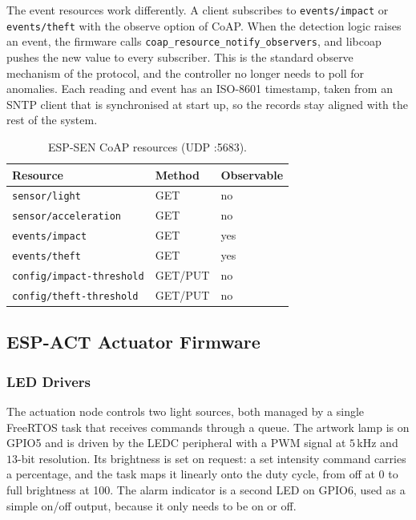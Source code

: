 \documentclass[conference]{IEEEtran}
\begin{document}
The event resources work differently. A client subscribes to \texttt{events/impact} or \texttt{events/theft} with the observe option of CoAP. When the detection logic raises an event, the firmware calls \texttt{coap\_resource\_notify\_observers}, and libcoap pushes the new value to every subscriber. This is the standard observe mechanism of the protocol, and the controller no longer needs to poll for anomalies. Each reading and event has an ISO-8601 timestamp, taken from an SNTP client that is synchronised at start up, so the records stay aligned with the rest of the system.

\begin{table}[htbp]
\caption{ESP-SEN CoAP resources (UDP :5683).}
\label{tab:coap}
\centering
\footnotesize
\begin{tabular}{@{}lll@{}}
\toprule
\textbf{Resource} & \textbf{Method} & \textbf{Observable} \\
\midrule
\texttt{sensor/light} & GET & no \\
\texttt{sensor/acceleration} & GET & no \\
\texttt{events/impact} & GET & yes \\
\texttt{events/theft} & GET & yes \\
\texttt{config/impact-threshold} & GET/PUT & no \\
\texttt{config/theft-threshold} & GET/PUT & no \\
\bottomrule
\end{tabular}
\end{table}

\subsection{ESP-ACT Actuator Firmware}

\subsubsection{LED Drivers}
The actuation node controls two light sources, both managed by a single FreeRTOS task that receives commands through a queue. The artwork lamp is on GPIO5 and is driven by the LEDC peripheral with a PWM signal at $5$\,kHz and $13$-bit resolution. Its brightness is set on request: a set intensity command carries a percentage, and the task maps it linearly onto the duty cycle, from off at 0 to full brightness at 100. The alarm indicator is a second LED on GPIO6, used as a simple on/off output, because it only needs to be on or off.
\end{document}
